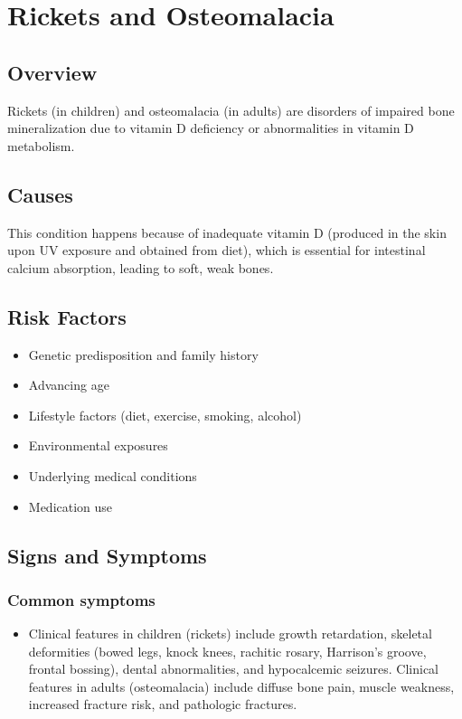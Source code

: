 \chapter{Rickets and Osteomalacia}
\label{sec:Rickets and Osteomalacia}

\section{Overview}
Rickets (in children) and osteomalacia (in adults) are disorders of impaired bone mineralization due to vitamin D deficiency or abnormalities in vitamin D metabolism.
\section{Causes}
This condition happens because of inadequate vitamin D (produced in the skin upon UV exposure and obtained from diet), which is essential for intestinal calcium absorption, leading to soft, weak bones.     
\section{Risk Factors}

\begin{itemize}[noitemsep]
  \item Genetic predisposition and family history
  \item Advancing age
  \item Lifestyle factors (diet, exercise, smoking, alcohol)
  \item Environmental exposures
  \item Underlying medical conditions
  \item Medication use
\end{itemize}
\section{Signs and Symptoms}

\subsection{Common symptoms}
\begin{itemize}[noitemsep]
  \item Clinical features in children (rickets) include growth retardation, skeletal deformities (bowed legs, knock knees, rachitic rosary, Harrison's groove, frontal bossing), dental abnormalities, and hypocalcemic seizures. Clinical features in adults (osteomalacia) include diffuse bone pain, muscle weakness, increased fracture risk, and pathologic fractures. 
  \end{itemize}

